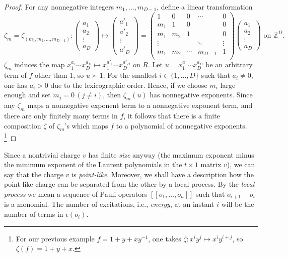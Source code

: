 \documentclass[letterpaper,12pt]{amsart}
\theoremstyle{definition} \newtheorem{defn}{Definition}
\theoremstyle{definition} \newtheorem{rem}{Remark}
\theoremstyle{definition} \newtheorem{example}{Example}
\begin{document}
\begin{proof}
For any nonnegative integers $m_1,\ldots,m_{D-1}$, define a linear transformation
\[
\zeta_m =
\zeta_{(m_1,m_2,\ldots,m_{D-1})} :
\begin{pmatrix}
 a_1 \\ a_2 \\ \vdots \\ a_D
\end{pmatrix}
\mapsto
 \begin{pmatrix}
  a'_1 \\ a'_2 \\ \vdots \\ a'_D
 \end{pmatrix}
=
\begin{pmatrix}
 1      & 0      & 0      & \cdots & 0       \\
 m_1    & 1      &  0     &        & 0       \\
 m_1    & m_2    &  1     &        & 0       \\
 \vdots &        &        & \ddots & \vdots  \\
 m_1    & m_2    & \cdots & m_{D-1}& 1       \\
\end{pmatrix}
\begin{pmatrix}
 a_1 \\ a_2 \\ \vdots \\ a_D
\end{pmatrix}
\text{ on } \mathbb{Z}^D .
\]
$\zeta_m$ induces the map $x_1^{a_1} \cdots x_D^{a_D} \mapsto x_1^{a'_1} \cdots x_D^{a'_D}$ on $R$.
Let $u=x_1^{a_1} \cdots x_D^{a_D}$ be an arbitrary term of $f$ other than $1$, so $u \succ 1$.
For the smallest $i \in \{1,\ldots,D\}$ such that $a_i \neq 0$,
one has $a_i > 0$ due to the lexicographic order.
Hence, if we choose $m_i$ large enough and set $m_j=0\,(j\neq i)$,
then $\zeta_m (u)$ has nonnegative exponents.
Since any $\zeta_{m}$ maps a nonnegative exponent term to a nonnegative exponent term,
and there are only finitely many terms in $f$,
it follows that
there is a finite composition $\zeta$ of $\zeta_m$'s 
which maps $f$ to a polynomial of nonnegative exponents.%
\footnote{
For our previous example $f = 1+y+xy^{-1}$,
one takes $\zeta : x^i y^j \mapsto x^i y^{i+j}$, so $\zeta(f) = 1 + y + x$.
}
\end{proof}


Since a nontrivial charge $v$ has finite {\em size} anyway
(the maximum exponent minus the minimum exponent of the Laurent polynomials 
in the $t \times 1$ matrix $v$),
we can say that the charge $v$ is {\em point-like}.
Moreover, we shall have a description how the point-like charge
can be separated from the other by a local process.
By the {\em local process} we mean a sequence of Pauli operators $[[o_1, \ldots, o_n]]$
such that $o_{i+1} - o_i$ is a monomial.
The number of excitations, i.e., {\em energy}, at an instant $i$ 
will be the number of terms in $\epsilon(o_i)$.
\end{document}
